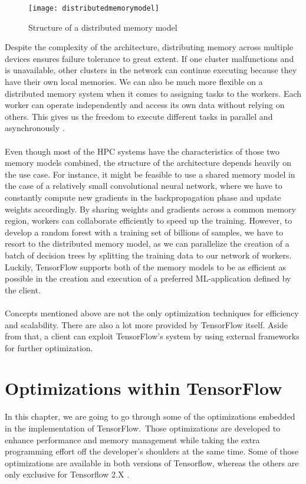 \documentclass[ieeetran]{article}
\begin{document}
\begin{figure}[h!]
  \centering
  \texttt{[image: distributedmemorymodel]}
  \caption{Structure of a distributed memory model}
  \label{fig:distributedmemorymodel}
\end{figure}

\hspace{-0.52cm}Despite the complexity of the architecture, distributing memory across multiple devices ensures failure tolerance to great extent. If one cluster malfunctions and is unavailable, other clusters in the network can continue executing because they have their own local memories. We can also be much more flexible on a distributed memory system when it comes to assigning tasks to the workers. Each worker can operate independently and access its own data without relying on others. This gives us the freedom to execute different tasks in parallel and asynchronously \cite{second} \cite{third}.
\\ \\Even though most of the HPC systems have the characteristics of those two memory models combined, the structure of the architecture depends heavily on the use case. For instance, it might be feasible to use a shared memory model in the case of a relatively small convolutional neural network, where we have to constantly compute new gradients in the backpropagation phase and update weights accordingly. By sharing weights and gradients across a common memory region, workers can collaborate efficiently to speed up the training. However, to develop a random forest with a training set of billions of samples, we have to resort to the distributed memory model, as we can parallelize the creation of a batch of decision trees by splitting the training data to our network of workers. Luckily, TensorFlow supports both of the memory models to be as efficient as possible in the creation and execution of a preferred ML-application defined by the client. 
\\ \\Concepts mentioned above are not the only optimization techniques for efficiency and scalability. There are also a lot more provided by TensorFlow itself. Aside from that, a client can exploit TensorFlow's system by using external frameworks for further optimization. 


\section{Optimizations within TensorFlow} %
\label{sec:optimizations_tensorflow}
In this chapter, we are going to go through some of the optimizations embedded in the implementation of TensorFlow.\ Those optimizations are developed to enhance performance and memory management while taking the extra programming effort off the developer's shoulders at the same time. Some of those optimizations are available in both versions of Tensorflow, whereas the others are only exclusive for Tensorflow 2.X \cite{first}.
\end{document}
